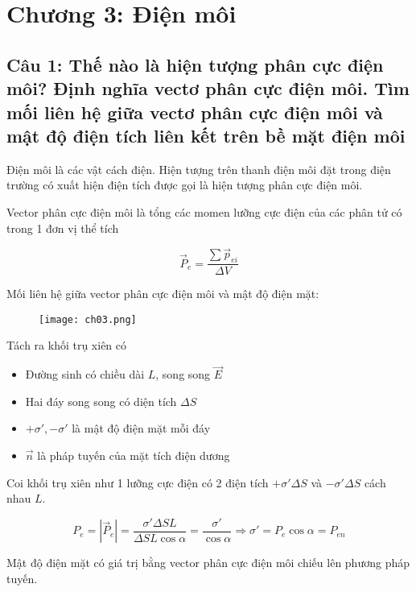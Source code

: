 \section[Chương 3]{Chương 3: Điện môi}

\subsection[Câu 1]{Câu 1: Thế nào là hiện tượng phân cực điện môi? Định nghĩa vectơ phân cực điện môi. Tìm mối liên hệ giữa vectơ phân cực điện môi và mật độ điện tích liên kết trên bề mặt điện môi}

Điện môi là các vật cách điện. Hiện tượng trên thanh điện môi đặt trong điện trường có xuất hiện điện tích được gọi là hiện tượng phân cực điện môi.

Vector phân cực điện môi là tổng các momen lưỡng cực điện của các phân tử có trong 1 đơn vị thể tích

\begin{equation*}
  \vec{P}_e = \frac{\sum \vec{p}_{ei}}{\Delta V}
\end{equation*}

Mối liên hệ giữa vector phân cực điện môi và mật độ điện mặt:

\begin{figure}[h]
  \centering
  \texttt{[image: ch03.png]}
\end{figure}

Tách ra khối trụ xiên có

\begin{itemize}
  \item Đường sinh có chiều dài $L$, song song $\vec{E}$
  \item Hai đáy song song có diện tích $\Delta S$
  \item $+\sigma', -\sigma'$ là mật độ điện mặt mỗi đáy
  \item $\vec{n}$ là pháp tuyến của mặt tích điện dương
\end{itemize}

Coi khối trụ xiên như 1 lưỡng cực điện có 2 điện tích $+\sigma' \Delta S$ và $-\sigma' \Delta S$ cách nhau $L$.

\begin{equation*}
  P_e = \left| \vec{P}_e \right| = \frac{\sigma' \Delta S L}{\Delta S L \cos\alpha} = \frac{\sigma'}{\cos\alpha} 
  \Rightarrow \sigma' = P_e\cos\alpha = P_{en}
\end{equation*}

Mật độ điện mặt có giá trị bằng vector phân cực điện môi chiếu lên phương pháp tuyến.

